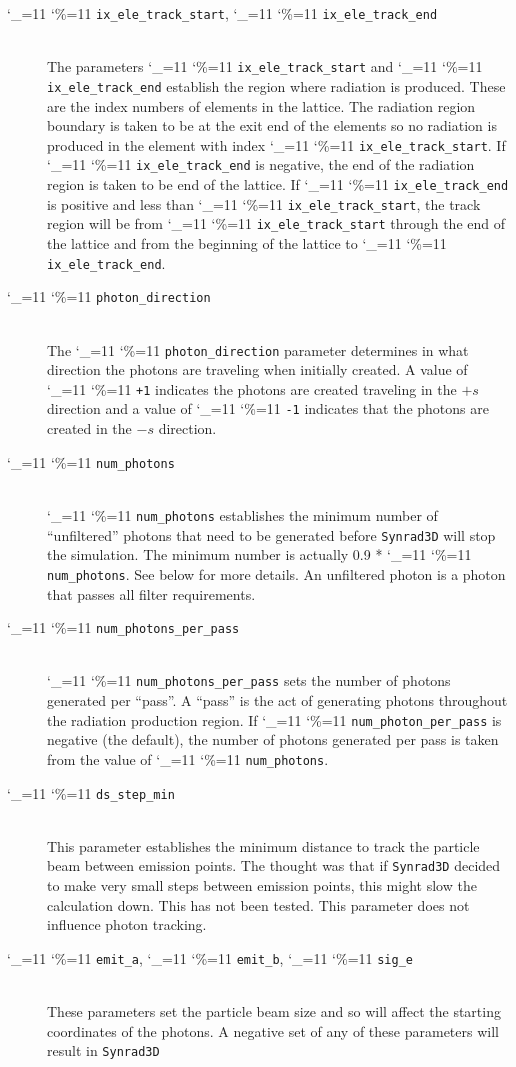 \documentclass[11pt,openany]{report}
\newcommand{\srthree}{\texttt{Synrad3D}\xspace}
\newcommand\ttcmd{\begingroup\catcode`\_=11 \catcode`\%=11 \dottcmd}
\newcommand\dottcmd[1]{\texttt{#1}\endgroup}
\newcommand{\vn}{\ttcmd}
\newcommand{\Newline}{\hfil \\}
\begin{document}
  \begin{description}
  \item[\vn{ix_ele_track_start}, \vn{ix_ele_track_end}] \Newline
The parameters \vn{ix_ele_track_start} and \vn{ix_ele_track_end} establish
the region where radiation is produced. These are the index numbers of 
elements in the lattice. The radiation region boundary is taken to be at
the exit end of the elements so no radiation is produced in the element
with index \vn{ix_ele_track_start}. If \vn{ix_ele_track_end} is negative,
the end of the radiation region is taken to be end of the lattice.
If \vn{ix_ele_track_end} is positive and less than \vn{ix_ele_track_start},
the track region will be from \vn{ix_ele_track_start} through the
end of the lattice and from the beginning of the lattice to \vn{ix_ele_track_end}.
  \item[\vn{photon_direction}] \Newline
The \vn{photon_direction} parameter determines in what direction the photons
are traveling when initially created. A value of \vn{+1} indicates the photons
are created traveling in the $+s$ direction and a value of \vn{-1} indicates
that the photons are created in the $-s$ direction.
  \item[\vn{num_photons}] \Newline
\vn{num_photons} establishes the minimum number of ``unfiltered''
photons that need to be generated before \srthree will stop the
simulation. The minimum number is actually 0.9 * \vn{num_photons}. See
below for more details. An unfiltered photon is a photon that passes
all filter requirements.  
  \item[\vn{num_photons_per_pass}] \Newline
\vn{num_photons_per_pass} sets the number of photons generated per
``pass''.  A ``pass'' is the act of generating photons throughout the
radiation production region. If \vn{num_photon_per_pass} is negative
(the default), the number of photons generated per pass is taken from
the value of \vn{num_photons}.
  \item[\vn{ds_step_min}] \Newline
This parameter establishes the minimum distance to track the particle beam between emission
points. The thought was that if \srthree decided to make very small steps  between emission
points, this might slow the calculation down. This has not been tested. This parameter
does not influence photon tracking.
  \item[\vn{emit_a}, \vn{emit_b}, \vn{sig_e}] \Newline
These parameters set the particle beam size and so will affect the starting coordinates of
the photons. A negative set of any of these parameters will result in \srthree 

\end{description}
\end{document}
